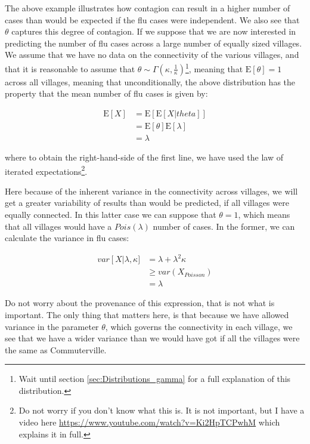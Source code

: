 \documentclass[11pt,fullpage]{book}
\begin{document}
The above example illustrates how contagion can result in a higher number of cases than would be expected if the flu cases were independent. We also see that $\theta$ captures this degree of contagion. If we suppose that we are now interested in predicting the number of flu cases across a large number of equally sized villages. We assume that we have no data on the connectivity of the various villages, and that it is reasonable to assume that $\theta\sim\Gamma(\kappa,\frac{1}{\kappa})$\footnote{Wait until section \ref{sec:Distributions_gamma} for a full explanation of this distribution.}, meaning that $\mathrm{E}[\theta] = 1$ across all villages, meaning that unconditionally, the above distribution has the property that the mean number of flu cases is given by:

\begin{equation}
\begin{align}
\mathrm{E}[X] &= \mathrm{E}\left[\mathrm{E}[X|theta]\right]\\
&= \mathrm{E}[\theta]\mathrm{E}[\lambda]\\
&= \lambda
\end{align}
\end{equation}

where to obtain the right-hand-side of the first line, we have used the law of iterated expectations\footnote{Do not worry if you don't know what this is. It is not important, but I have a video here \url{https://www.youtube.com/watch?v=Ki2HpTCPwhM} which explains it in full.}. 

Here because of the inherent variance in the connectivity across villages, we will get a greater variability of results than would be predicted, if all villages were equally connected. In this latter case we can suppose that $\theta=1$, which means that all villages would have a $Pois(\lambda)$ number of cases. In the former, we can calculate the variance in flu cases:

\begin{equation}
\begin{align}
var\left[X\right|\lambda,\kappa] &= \lambda + \lambda^2\kappa\\
&\geq var(X_{Poisson})\\
&= \lambda
\end{align}
\end{equation}

Do not worry about the provenance of this expression, that is not what is important. The only thing that matters here, is that because we have allowed variance in the parameter $\theta$, which governs the connectivity in each village, we see that we have a wider variance than we would have got if all the villages were the same as Commuterville.
\end{document}
